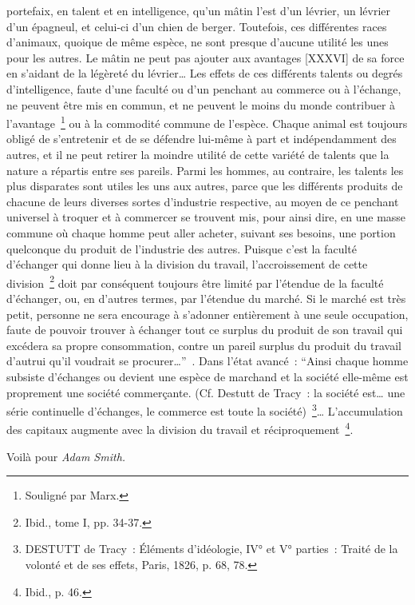 \documentclass[french,twoside]{book} %
\newenvironment{quoteblock}%
  {\begin{quoting}}
  {\end{quoting}}
\newenvironment{quotebar}{%
    \def\FrameCommand{{\color{rubric!10!}\vrule width 0.5em} \hspace{0.9em}}%
    \def\OuterFrameSep{\itemsep} %
    \MakeFramed {\advance\hsize-\width \FrameRestore}
  }%
  {%
    \endMakeFramed
  }
\renewenvironment{quoteblock}%
  {%
    \savenotes
    \setstretch{0.9}
    \normalfont
    \begin{quotebar}
  }
  {%
    \end{quotebar}
    \spewnotes
  }
\begin{document}
\begin{quoteblock}
portefaix, en talent et en intelligence, qu’un mâtin l’est d’un lévrier, un lévrier d’un épagneul, et celui-ci d’un chien de berger. Toutefois, ces différentes races d’animaux, quoique de même espèce, ne sont presque d’aucune utilité les unes pour les autres. Le mâtin ne peut pas ajouter aux avantages [XXXVI] de sa force en s’aidant de la légèreté du lévrier… Les effets de ces différents talents ou degrés d’intelligence, faute d’une faculté ou d’un penchant au commerce ou à l’échange, ne peuvent être mis en commun, et ne peuvent le moins du monde contribuer à l’avantage \footnote{Souligné par Marx.} ou à la commodité commune de l’espèce. Chaque animal est toujours obligé de s’entretenir et de se défendre lui-même à part et indépendamment des autres, et il ne peut retirer la moindre utilité de cette variété de talents que la nature a répartis entre ses pareils. Parmi les hommes, au contraire, les talents les plus disparates sont utiles les uns aux autres, parce que les différents produits de chacune de leurs diverses sortes d’industrie respective, au moyen de ce penchant universel à troquer et à commercer se trouvent mis, pour ainsi dire, en une masse commune où chaque homme peut aller acheter, suivant ses besoins, une portion quelconque du produit de l’industrie des autres. Puisque c’est la faculté d’échanger qui donne lieu à la division du travail, l’accroissement de cette division \footnote{Ibid., tome I, pp. 34-37.} doit par conséquent toujours être limité par l’étendue de la faculté d’échanger, ou, en d’autres termes, par l’étendue du marché. Si le marché est très petit, personne ne sera encourage à s’adonner entièrement à une seule occupation, faute de pouvoir trouver à échanger tout ce surplus du produit de son travail qui excédera sa propre consommation, contre un pareil surplus du produit du travail d’autrui qu’il voudrait se procurer…” . Dans l’état avancé : “Ainsi chaque homme subsiste d’échanges ou devient une espèce de marchand et la société elle-même est proprement une société commerçante. (Cf. Destutt de Tracy : la société est… une série continuelle d’échanges, le commerce est toute la société) \footnote{DESTUTT de Tracy : Éléments d’idéologie, IV° et V° parties : Traité de la volonté et de ses effets, Paris, 1826, p. 68, 78.}… L’accumulation des capitaux augmente avec la division du travail et réciproquement \footnote{Ibid., p. 46.}.
 \end{quoteblock}

\noindent Voilà pour \emph{Adam Smith.}\par
\end{document}
